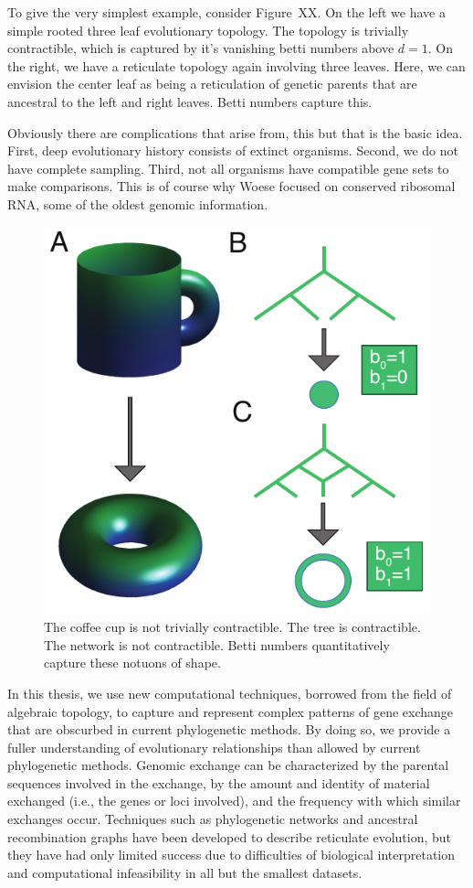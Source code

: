 To give the very simplest example, consider Figure~XX.
On the left we have a simple rooted three leaf evolutionary topology.
The topology is trivially contractible, which is captured by it's vanishing betti numbers above $d=1$.
On the right, we have a reticulate topology again involving three leaves.
Here, we can envision the center leaf as being a reticulation of genetic parents that are ancestral to the left and right leaves.
Betti numbers capture this.

Obviously there are complications that arise from, this but that is the basic idea.
First, deep evolutionary history consists of extinct organisms.
Second, we do not have complete sampling.
Third, not all organisms have compatible gene sets to make comparisons.
This is of course why Woese focused on conserved ribosomal RNA, some of the oldest genomic information.

\begin{figure}
\centering
\includegraphics[width=.5\columnwidth]{./fig/introduction/topology_example.pdf}
\caption[The Paradigmatic Topology Example]{The coffee cup is not trivially contractible. The tree is contractible. The network is not contractible. Betti numbers quantitatively capture these notuons of shape.}
\label{intro:fig:topology_example}
\end{figure}

In this thesis, we use new computational techniques, borrowed from the field of algebraic topology, to capture and represent complex patterns of gene exchange that are obscurbed in current phylogenetic methods.
By doing so, we provide a fuller understanding of evolutionary relationships than allowed by current phylogenetic methods.
Genomic exchange can be characterized by the parental sequences involved in the exchange, by the amount and identity of material exchanged (i.e., the genes or loci involved), and the frequency with which similar exchanges occur.
Techniques such as phylogenetic networks and ancestral recombination graphs have been developed to describe reticulate evolution, but they have had only limited success due to difficulties of biological interpretation and computational infeasibility in all but the smallest datasets.

